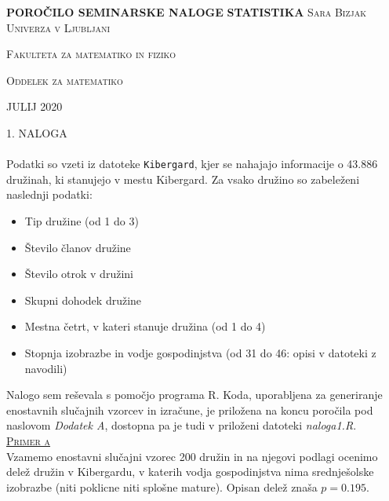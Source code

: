 \documentclass[a4paper,12pt]{article}
\begin{document}
\begin{titlepage}
    \centering
    \vfill
    \vfill
    \textbf{\large{POROČILO SEMINARSKE NALOGE}}
    \vfill
    \textbf{\Huge{STATISTIKA}}
    \vfill\vfill\vfill\vfill\vfill
    \textsc{\Large{Sara Bizjak}}
    \vfill\vfill
    \textsc{\large{Univerza v Ljubljani}}
    
    \textsc{\large{Fakulteta za matematiko in fiziko}}
    
    \textsc{\large{Oddelek za matematiko}}
    \vfill\vfill
        
    \large{JULIJ 2020}
    
\end{titlepage}


\newpage


\noindent
\textsc{\large{1. NALOGA}}
\\
\\
Podatki so vzeti iz datoteke \texttt{Kibergard}, kjer se nahajajo informacije o 43.886 družinah, ki stanujejo v mestu Kibergard. Za vsako družino so zabeleženi naslednji podatki:
\begin{itemize}
    \item Tip družine (od 1 do 3)
    \item Število članov družine
    \item Število otrok v družini
    \item Skupni dohodek družine
    \item Mestna četrt, v kateri stanuje družina (od 1 do 4)
    \item Stopnja izobrazbe in vodje gospodinjstva (od 31 do 46: opisi v datoteki z navodili)
\end{itemize}

\noindent
Nalogo sem reševala s pomočjo programa R. Koda, uporabljena za generiranje enostavnih slučajnih vzorcev in izračune, je priložena na koncu poročila pod naslovom \textit{Dodatek A}, dostopna pa je tudi v priloženi datoteki \textit{naloga1.R}. 
\\


\noindent
\textsc{\underline{Primer a}}
\\
Vzamemo enostavni slučajni vzorec 200 družin in na njegovi podlagi ocenimo delež družin v Kibergardu, v katerih vodja gospodinjstva nima srednješolske izobrazbe (niti poklicne niti splošne mature).
Opisan delež znaša $p = 0.195$.
\\
\end{document}
